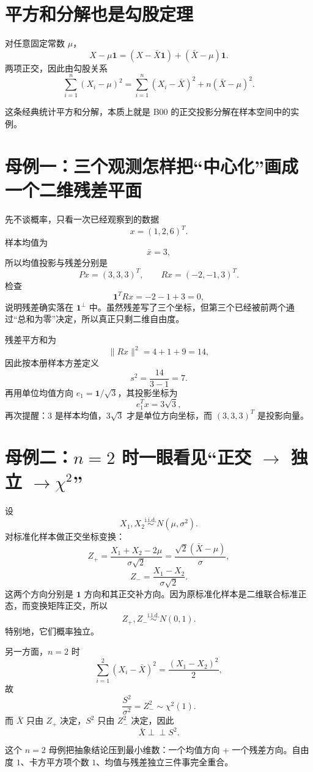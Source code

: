 \documentclass[profile=standard]{ipara-handbook}
\begin{document}
\section{平方和分解也是勾股定理}
对任意固定常数 $\mu$，
\[
X-\mu\mathbf1
=(X-\bar X\mathbf1)+(\bar X-\mu)\mathbf1.
\]
两项正交，因此由勾股关系
\[
\boxed{
\sum_{i=1}^n(X_i-\mu)^2
=\sum_{i=1}^n(X_i-\bar X)^2
+n(\bar X-\mu)^2.
}
\]

这条经典统计平方和分解，本质上就是 B00 的正交投影分解在样本空间中的实例。

\section{母例一：三个观测怎样把“中心化”画成一个二维残差平面}
先不谈概率，只看一次已经观察到的数据
\[
x=(1,2,6)^T.
\]
样本均值为
\[
\bar x=3,
\]
所以均值投影与残差分别是
\[
Px=(3,3,3)^T,
\qquad
Rx=(-2,-1,3)^T.
\]
检查
\[
\mathbf1^TRx=-2-1+3=0,
\]
说明残差确实落在 $\mathbf1^\perp$ 中。虽然残差写了三个坐标，但第三个已经被前两个通过“总和为零”决定，所以真正只剩二维自由度。

残差平方和为
\[
\lVert Rx\rVert^2=4+1+9=14,
\]
因此按本册样本方差定义
\[
s^2=\frac{14}{3-1}=7.
\]
再用单位均值方向 $e_1=\mathbf1/\sqrt3$，其投影坐标为
\[
e_1^Tx=3\sqrt3,
\]
再次提醒：$3$ 是样本均值，$3\sqrt3$ 才是单位方向坐标，而 $(3,3,3)^T$ 是投影向量。

\section{母例二：$n=2$ 时一眼看见“正交 $\to$ 独立 $\to\chi^2$”}
设
\[
X_1,X_2\overset{\mathrm{i.i.d.}}\sim N(\mu,\sigma^2).
\]
对标准化样本做正交坐标变换：
\[
Z_+=\frac{X_1+X_2-2\mu}{\sigma\sqrt2}
=\frac{\sqrt2(\bar X-\mu)}{\sigma},
\]
\[
Z_- =\frac{X_1-X_2}{\sigma\sqrt2}.
\]
这两个方向分别是 $\mathbf1$ 方向和其正交补方向。因为原标准化样本是二维联合标准正态，而变换矩阵正交，所以
\[
Z_+,Z_-\overset{\mathrm{i.i.d.}}\sim N(0,1).
\]
特别地，它们概率独立。

另一方面，$n=2$ 时
\[
\sum_{i=1}^2(X_i-\bar X)^2
=\frac{(X_1-X_2)^2}{2},
\]
故
\[
\frac{S^2}{\sigma^2}
=Z_-^2
\sim\chi^2(1).
\]
而 $\bar X$ 只由 $Z_+$ 决定，$S^2$ 只由 $Z_-^2$ 决定，因此
\[
\bar X\perp\!\!\!\perp S^2.
\]

这个 $n=2$ 母例把抽象结论压到最小维数：一个均值方向 + 一个残差方向。自由度 $1$、卡方平方项个数 $1$、均值与残差独立三件事完全重合。
\end{document}
